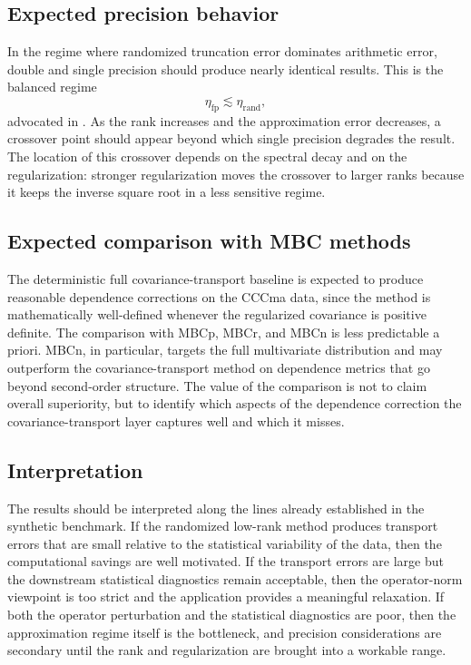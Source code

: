 \subsection{Expected precision behavior}

In the regime where randomized truncation error dominates arithmetic error, double
and single precision should produce nearly identical results. This is the balanced
regime
\[
	\eta_{\mathrm{fp}} \lesssim \eta_{\mathrm{rand}},
\]
advocated in . As the rank increases and the approximation
error decreases, a crossover point should appear beyond which single precision
degrades the result. The location of this crossover depends on the spectral decay
and on the regularization: stronger regularization moves the crossover to larger
ranks because it keeps the inverse square root in a less sensitive regime.

\subsection{Expected comparison with MBC methods}

The deterministic full covariance-transport baseline is expected to produce
reasonable dependence corrections on the CCCma data, since the method is
mathematically well-defined whenever the regularized covariance is positive
definite. The comparison with MBCp, MBCr, and MBCn is less predictable a priori.
MBCn, in particular, targets the full multivariate distribution and may outperform
the covariance-transport method on dependence metrics that go beyond second-order
structure. The value of the comparison is not to claim overall superiority, but to
identify which aspects of the dependence correction the covariance-transport layer
captures well and which it misses.

\subsection{Interpretation}

The results should be interpreted along the lines already established in the
synthetic benchmark. If the randomized low-rank method produces transport errors
that are small relative to the statistical variability of the data, then the
computational savings are well motivated. If the transport errors are large but the
downstream statistical diagnostics remain acceptable, then the operator-norm
viewpoint is too strict and the application provides a meaningful relaxation. If
both the operator perturbation and the statistical diagnostics are poor, then the
approximation regime itself is the bottleneck, and precision considerations are
secondary until the rank and regularization are brought into a workable range.

